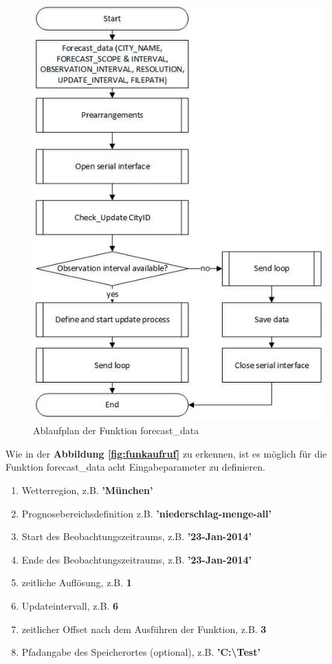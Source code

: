 \begin{figure}
\centering
\includegraphics[scale=1]{programm/flowchart}
\caption{Ablaufplan der Funktion forecast\_data}
\label{fig:flowchart}
\end{figure} 
Wie in der \textbf{Abbildung \ref{fig:funkaufruf}} zu erkennen, ist es möglich für die Funktion \textsf{forecast\_data} acht Eingabeparameter zu definieren. 
\begin{enumerate}
\item Wetterregion, z.B. \textbf{'München'}
\item Prognosebereichsdefinition z.B. \textbf{'niederschlag-menge-all'}
\item Start des Beobachtungszeitraums, z.B. \textbf{'23-Jan-2014'}
\item Ende des Beobachtungszeitraums, z.B. \textbf{'23-Jan-2014'}
\item zeitliche Auflösung, z.B. \textbf{1}
\item Updateintervall, z.B. \textbf{6}
\item zeitlicher Offset nach dem Ausführen der Funktion, z.B. \textbf{3}
\item Pfadangabe des Speicherortes (optional), z.B. \textbf{'C:\textbackslash Test'}
\end{enumerate}
